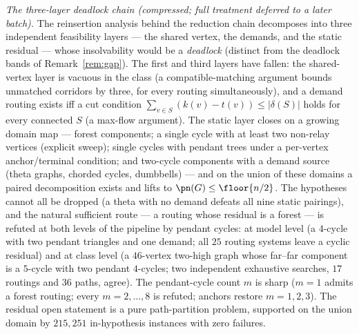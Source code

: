 \emph{The three-layer deadlock chain (compressed; full treatment deferred to a later batch).}
The reinsertion analysis behind the reduction chain decomposes into three independent
feasibility layers --- the shared vertex, the demands, and the static residual --- whose
insolvability would be a \emph{deadlock} (distinct from the deadlock bands of
Remark~\ref{rem:gap}). The first and third layers have fallen: the shared-vertex layer is
vacuous in the class (a compatible-matching argument bounds unmatched corridors by three, for
every routing simultaneously), and a demand routing exists iff a cut condition
$\sum_{v\in S}(k(v)-t(v))\le|\delta(S)|$ holds for every connected $S$ (a max-flow argument).
The static layer closes on a growing domain map --- forest components; a single cycle with at
least two non-relay vertices (explicit sweep); single cycles with pendant trees under a
per-vertex anchor/terminal condition; and two-cycle components with a demand source (theta
graphs, chorded cycles, dumbbells) --- and on the union of these domains a paired
decomposition exists and lifts to $\pn(G)\le\floor{n/2}$. The hypotheses cannot all be dropped
(a theta with no demand defeats all nine static pairings), and the natural sufficient route ---
a routing whose residual is a forest --- is refuted at both levels of the pipeline by pendant
cycles: at model level (a $4$-cycle with two pendant triangles and one demand; all $25$
routing systems leave a cyclic residual) and at class level (a $46$-vertex two-high graph
whose far--far component is a $5$-cycle with two pendant $4$-cycles; two independent
exhaustive searches, $17$ routings and $36$ paths, agree). The pendant-cycle count $m$ is
sharp ($m=1$ admits a forest routing; every $m=2,\dots,8$ is refuted; anchors restore
$m=1,2,3$). The residual open statement is a pure path-partition problem, supported on the
union domain by $215{,}251$ in-hypothesis instances with zero failures.

